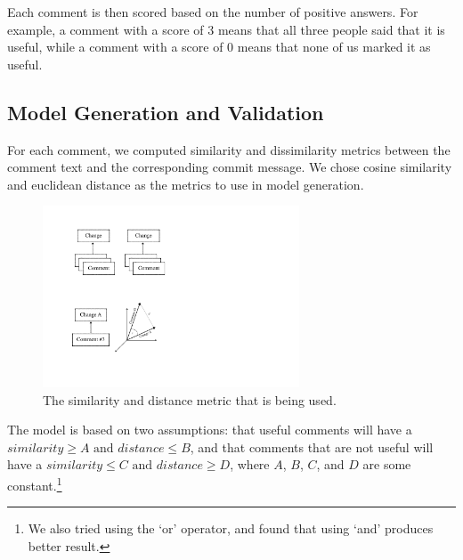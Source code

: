 \documentclass[conference]{IEEEtran}
\begin{document}
Each comment is then scored based on the number of positive answers.
For example, a comment with a score of 3 means that all three people said that it is useful,
while a comment with a score of 0 means that none of us marked it as useful.



\subsection{Model Generation and Validation}

For each comment, we computed similarity and dissimilarity metrics
between the comment text and the corresponding commit message.
We chose cosine similarity and euclidean distance as the metrics to use in model generation.

\begin{figure}[h]
\centering
\includegraphics[width=3in]{vector}
\caption{The similarity and distance metric that is being used.}
\label{fig:vector}
\end{figure}

The model is based on two assumptions: that useful comments will have a $similarity \geq A \text{ and } distance \leq B$,
and that comments that are not useful will have a $ similarity \leq C \text{ and } distance \geq D$,
where $A$, $B$, $C$, and $D$ are some constant.\footnote{We also tried using the `or' operator, and found that using `and' produces better result.}
\end{document}
